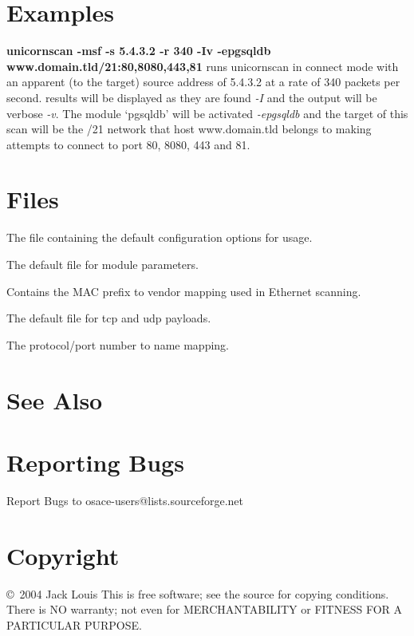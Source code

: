 \documentclass[english]{article}
\begin{document}
\section{Examples}
\begin{Description}
\textbf{unicornscan -msf -s 5.4.3.2 -r 340 -Iv -epgsqldb www.domain.tld/21:80,8080,443,81}
runs unicornscan in connect mode with an apparent (to the target) source address of 5.4.3.2 at a rate
of 340 packets per second. results will be displayed as they are found \emph{-I} and the output
will be verbose \emph{-v}. The module `pgsqldb' will be activated \emph{-epgsqldb} and
the target of this scan will be the /21 network that host www.domain.tld belongs to making attempts
to connect to port 80, 8080, 443 and 81.
\end{Description}

\section{Files}
\begin{Description}
\item[\File{unicorn.conf}] The file containing the default configuration options for usage.
\item[\File{modules.conf}] The default file for module parameters.
\item[\File{oui.txt}] Contains the MAC prefix to vendor mapping used in Ethernet scanning.
\item[\File{payloads.conf}] The default file for tcp and udp payloads.
\item[\File{ports.txt}] The protocol/port number to name mapping.
\end{Description}

\section{See Also}
    

\section{Reporting Bugs}
\begin{description}
Report Bugs to osace-users@lists.sourceforge.net
\end{description}

\section{Copyright}
\begin{description}
\copyright\ 2004 Jack Louis 
This is free software; see the source for  copying  conditions.  There is NO warranty; not even for
MERCHANTABILITY or FITNESS FOR A PARTICULAR PURPOSE.
\end{description}

\LatexManEnd
\end{document}
